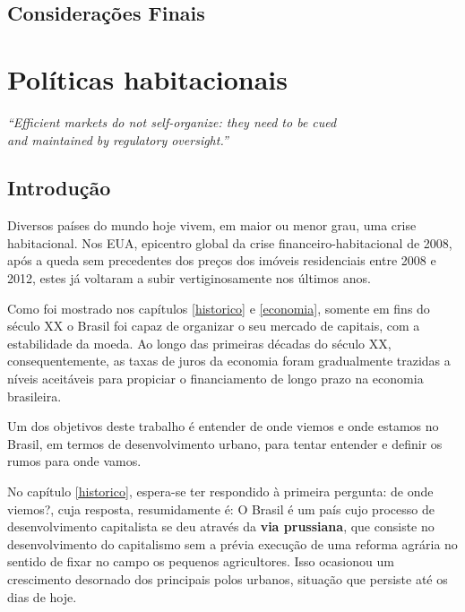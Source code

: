\documentclass[
	12pt,				%
	oneside,			%
	a4paper,			%
	chapter=TITLE,		%
	section=TITLE,		%
	english,			%
	brazil				%
	]{abntex2}
\begin{document}
\begin{refsection}
\hypertarget{considerauxe7uxf5es-finais-3}{%
\section{Considerações Finais}\label{considerauxe7uxf5es-finais-3}}

\printbibliography[heading=subbibintoc]
\end{refsection}
\hypertarget{politicas}{%
\chapter{Políticas habitacionais}\label{politicas}}
\begin{refsection}
\begin{epigrafe}
    \vspace*{\fill}
    \begin{flushright}
    \textit{``Efficient markets do not self-organize: they need to be cued\\
    and maintained by regulatory oversight.''\\
    \cite[p. 540]{mccoy}}
    \end{flushright}
\end{epigrafe}
\hypertarget{introduuxe7uxe3o-5}{%
\section{Introdução}\label{introduuxe7uxe3o-5}}

Diversos países do mundo hoje vivem, em maior ou menor grau, uma
crise habitacional. Nos \gls{EUA}, epicentro global da
crise financeiro-habitacional de 2008, após a queda sem precedentes dos preços
dos imóveis residenciais entre 2008 e 2012, estes já voltaram a subir
vertiginosamente nos últimos anos.

Como foi mostrado nos capítulos \ref{historico} e \ref{economia}, somente em
fins do século XX o Brasil foi capaz de organizar o seu mercado de capitais, com
a estabilidade da moeda. Ao longo das primeiras décadas do século XX,
consequentemente, as taxas de juros da economia foram gradualmente trazidas a
níveis aceitáveis para propiciar o financiamento de longo prazo na economia
brasileira.

Um dos objetivos deste trabalho é entender de onde viemos e onde estamos no
Brasil, em termos de desenvolvimento urbano, para tentar entender e definir os
rumos para onde vamos.

No capítulo \ref{historico}, espera-se ter respondido à primeira pergunta: de
onde viemos?, cuja resposta, resumidamente é: O Brasil é um país cujo processo
de desenvolvimento capitalista se deu através da \textbf{via prussiana}, que
consiste no desenvolvimento do capitalismo sem a prévia execução de uma reforma
agrária no sentido de fixar no campo os pequenos agricultores. Isso ocasionou
um crescimento desornado dos principais polos urbanos, situação que persiste até
os dias de hoje.


\end{refsection}
\end{document}
